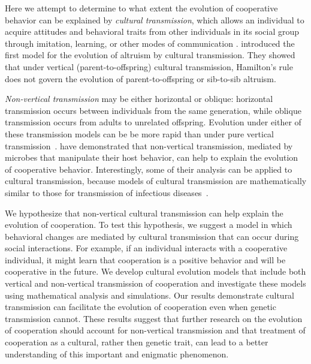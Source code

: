 \documentclass[12pt]{extarticle}
\begin{document}
Here we attempt to determine to what extent the evolution of cooperative behavior can be explained by \emph{cultural transmission},
which allows an individual to acquire attitudes and behavioral traits from other individuals in its social group through imitation, learning, or other modes of communication \citep{cavalli1981cultural,richerson2008not}.
\citet{feldman1985gene} introduced the first model for the evolution of altruism by cultural transmission.
They showed that under vertical (parent-to-offspring) cultural transmission, Hamilton's rule does not govern the evolution of parent-to-offspring or sib-to-sib altruism.

\emph{Non-vertical transmission} may be either horizontal or oblique: horizontal transmission occurs between individuals from the same generation, while oblique transmission occurs from adults to unrelated offspring. 
Evolution under either of these transmission models  can be be more rapid than under pure vertical transmission~\citep{cavalli1981cultural,ram2018evolution}.
\citet{lewin2017microbes} have demonstrated that non-vertical transmission, mediated by microbes that manipulate their host behavior, can help to explain the evolution of cooperative behavior. Interestingly, some of their analysis can be applied to cultural transmission, because models of cultural transmission are mathematically similar to those for transmission of infectious diseases~\citep{cavalli1981cultural}.

We hypothesize that non-vertical cultural transmission can help explain the evolution of cooperation. 
To test this hypothesis, we suggest a model in which behavioral changes are mediated by cultural transmission that can occur during social interactions. For example, if an individual interacts with a cooperative individual, it might learn that cooperation is a positive behavior and will be cooperative in the future. 
We develop cultural evolution models that include both vertical and non-vertical transmission of cooperation and investigate these models using mathematical analysis and simulations.  
Our results demonstrate cultural transmission can facilitate the evolution of cooperation even when genetic transmission cannot.
These results suggest that further research on the evolution of cooperation should account for non-vertical transmission and that treatment of cooperation as a cultural, rather then genetic trait, can lead to a better understanding of this important and enigmatic phenomenon.
\end{document}
